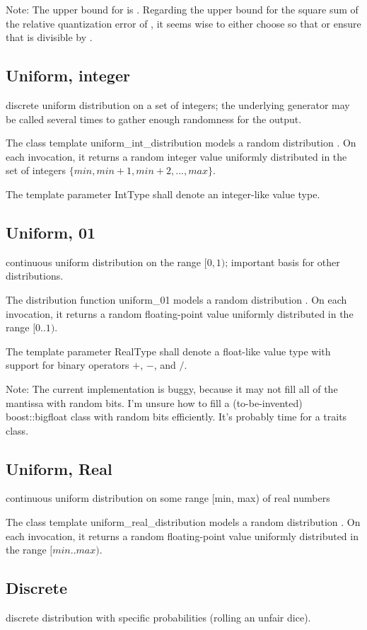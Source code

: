 Note: The upper bound for  is . Regarding the upper bound for the square sum of the relative quantization error of , it seems wise to either choose  so that  or ensure that  is divisible by . 


\subsection{Uniform, integer}
discrete uniform distribution on a set of integers; the underlying generator may be called several times to gather enough randomness for the output.

The class template uniform\_int\_distribution models a random distribution . On each invocation, it returns a random integer value uniformly distributed in the set of integers $\{min, min+1, min+2, ..., max\}$.

The template parameter IntType shall denote an integer-like value type.


\subsection{Uniform, 01}
continuous uniform distribution on the range $[0,1)$; important basis for other distributions.

The distribution function uniform\_01 models a random distribution . On each invocation, it returns a random floating-point value uniformly distributed in the range $[0..1)$.

The template parameter RealType shall denote a float-like value type with support for binary operators $+$, $-$, and $/$.

Note: The current implementation is buggy, because it may not fill all of the mantissa with random bits. I'm unsure how to fill a (to-be-invented) boost::bigfloat class with random bits efficiently. It's probably time for a traits class. 


\subsection{Uniform, Real}
continuous uniform distribution on some range [min, max) of real numbers 

The class template uniform\_real\_distribution models a random distribution . On each invocation, it returns a random floating-point value uniformly distributed in the range $[min..max)$. 

\subsection{Discrete}
discrete distribution with specific probabilities (rolling an unfair dice). 

